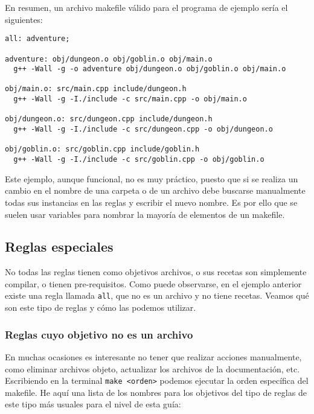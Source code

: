 \documentclass[11pt,twoside,titlepage,a4paper]{article}
\theoremstyle{definition}
\theoremstyle{plain_rojo}
\theoremstyle{remark}
\begin{document}
En resumen, un archivo makefile válido para el programa de ejemplo sería el
siguientes:

\begin{lstlisting}
all: adventure;

adventure: obj/dungeon.o obj/goblin.o obj/main.o
  g++ -Wall -g -o adventure obj/dungeon.o obj/goblin.o obj/main.o

obj/main.o: src/main.cpp include/dungeon.h
  g++ -Wall -g -I./include -c src/main.cpp -o obj/main.o

obj/dungeon.o: src/dungeon.cpp include/dungeon.h
  g++ -Wall -g -I./include -c src/dungeon.cpp -o obj/dungeon.o
  
obj/goblin.o: src/goblin.cpp include/goblin.h
  g++ -Wall -g -I./include -c src/goblin.cpp -o obj/goblin.o
\end{lstlisting}
\bigskip
Este ejemplo, aunque funcional, no es muy práctico, puesto que si se realiza 
un cambio en el nombre de una carpeta o de un archivo debe buscarse
manualmente todas sus instancias en las reglas y escribir el nuevo nombre. Es
por ello que se suelen usar variables para nombrar la mayoría de elementos de
un makefile.
\newpage
\subsection{Reglas especiales}

No todas las reglas tienen como objetivos archivos, o sus recetas son 
simplemente compilar, o tienen pre-requisitos. Como puede observarse, en el 
ejemplo anterior existe una regla llamada \texttt{all}, que no es un archivo
y no tiene recetas. Veamos qué son este tipo de reglas y cómo las podemos
utilizar.

\subsubsection{Reglas cuyo objetivo no es un archivo}

En muchas ocasiones es interesante no tener que realizar acciones 
manualmente, como eliminar archivos objeto, actualizar los archivos de la 
documentación, etc. Escribiendo en la terminal \texttt{make <orden>} podemos 
ejecutar la orden específica del makefile. He aquí una lista de los nombres 
para los objetivos del tipo de reglas de este tipo más usuales para el nivel
de esta guía:
\end{document}
